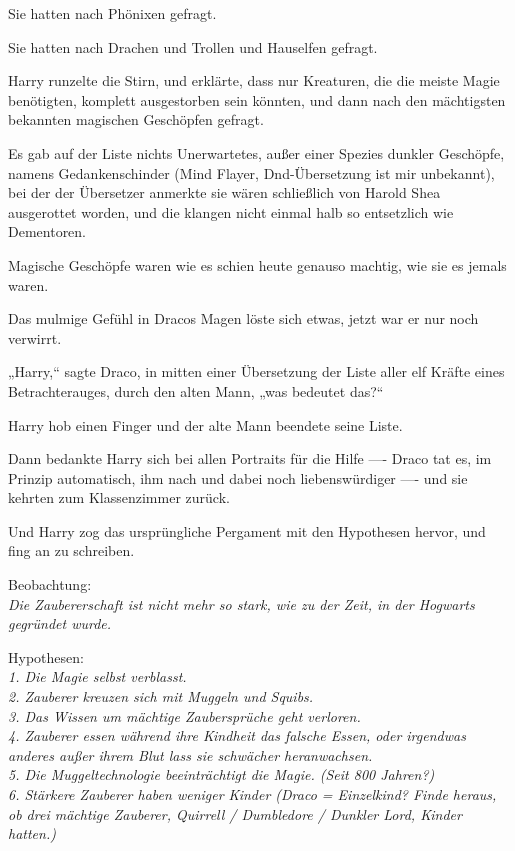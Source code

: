 {Sie hatten nach Phönixen gefragt.

Sie hatten nach Drachen und Trollen und Hauselfen gefragt.

Harry runzelte die Stirn, und erklärte, dass nur Kreaturen, die die meiste Magie benötigten, komplett ausgestorben sein könnten, und dann nach den mächtigsten bekannten magischen Geschöpfen gefragt.

Es gab auf der Liste nichts Unerwartetes, außer einer Spezies dunkler Geschöpfe, namens Gedankenschinder (Mind Flayer, Dnd-Übersetzung ist mir unbekannt), bei der der Übersetzer anmerkte sie wären schließlich von Harold Shea ausgerottet worden, und die klangen nicht einmal halb so entsetzlich wie Dementoren.

Magische Geschöpfe waren wie es schien heute genauso machtig, wie sie es jemals waren.

Das mulmige Gefühl in Dracos Magen löste sich etwas, jetzt war er nur noch verwirrt.

„Harry,“ sagte Draco, in mitten einer Übersetzung der Liste aller elf Kräfte eines Betrachterauges, durch den alten Mann, „was bedeutet das?“

Harry hob einen Finger und der alte Mann beendete seine Liste.

Dann bedankte Harry sich bei allen Portraits für die Hilfe ---- Draco tat es, im Prinzip automatisch, ihm nach und dabei noch liebenswürdiger ---- und sie kehrten zum Klassenzimmer zurück.

Und Harry zog das ursprüngliche Pergament mit den Hypothesen hervor, und fing an zu schreiben.

Beobachtung:\\ \emph{Die Zaubererschaft ist nicht mehr so stark, wie zu der Zeit, in der Hogwarts gegründet wurde.}

Hypothesen:\\ \emph{1\emph{. Die Magie selbst verblasst.}}\\ \emph{2. Zauberer \emph{kreuzen sich mit Muggeln und Squibs.}}\\ \emph{3. Das Wissen um mächtige Zaubersprüche geht verloren.}\\ \emph{4. Zauberer essen während ihre Kindheit das falsche Essen, oder irgendwas anderes außer ihrem Blut lass sie schwächer heranwachsen.}\\ \emph{5. Die Muggeltechnologie beeinträchtigt die Magie. (Seit 800 Jahren?)}\\ \emph{6. Stärkere Zauberer haben weniger Kinder (Draco = Einzelkind? Finde heraus, ob drei mächtige Zauberer, Quirrell / Dumbledore / Dunkler Lord, Kinder hatten.)}

}
